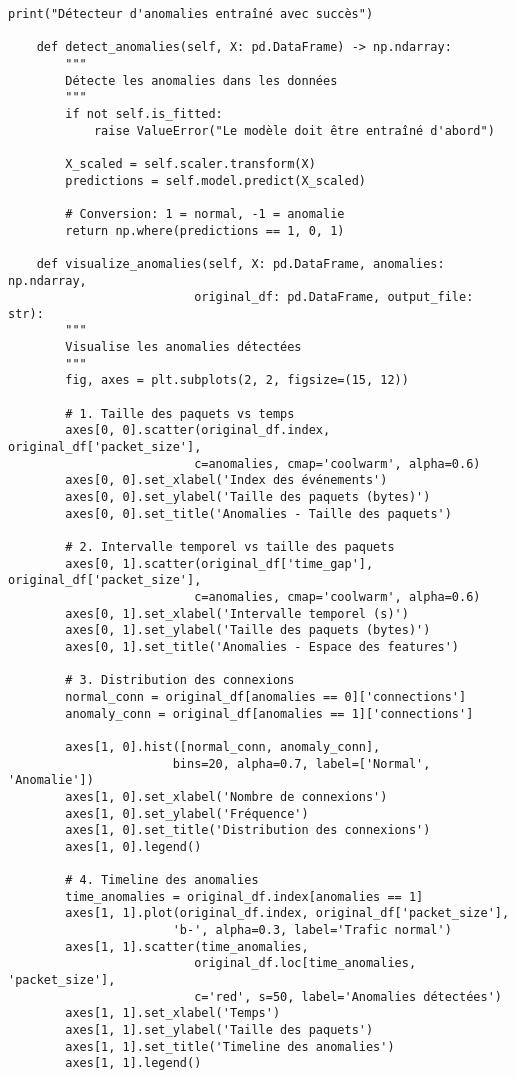 \documentclass[12pt,a4paper]{article}
\begin{document}
\begin{lstlisting}[caption=Détection d'anomalies avec Isolation Forest]
        print("Détecteur d'anomalies entraîné avec succès")
    
    def detect_anomalies(self, X: pd.DataFrame) -> np.ndarray:
        """
        Détecte les anomalies dans les données
        """
        if not self.is_fitted:
            raise ValueError("Le modèle doit être entraîné d'abord")
        
        X_scaled = self.scaler.transform(X)
        predictions = self.model.predict(X_scaled)
        
        # Conversion: 1 = normal, -1 = anomalie
        return np.where(predictions == 1, 0, 1)
    
    def visualize_anomalies(self, X: pd.DataFrame, anomalies: np.ndarray, 
                          original_df: pd.DataFrame, output_file: str):
        """
        Visualise les anomalies détectées
        """
        fig, axes = plt.subplots(2, 2, figsize=(15, 12))
        
        # 1. Taille des paquets vs temps
        axes[0, 0].scatter(original_df.index, original_df['packet_size'],
                          c=anomalies, cmap='coolwarm', alpha=0.6)
        axes[0, 0].set_xlabel('Index des événements')
        axes[0, 0].set_ylabel('Taille des paquets (bytes)')
        axes[0, 0].set_title('Anomalies - Taille des paquets')
        
        # 2. Intervalle temporel vs taille des paquets
        axes[0, 1].scatter(original_df['time_gap'], original_df['packet_size'],
                          c=anomalies, cmap='coolwarm', alpha=0.6)
        axes[0, 1].set_xlabel('Intervalle temporel (s)')
        axes[0, 1].set_ylabel('Taille des paquets (bytes)')
        axes[0, 1].set_title('Anomalies - Espace des features')
        
        # 3. Distribution des connexions
        normal_conn = original_df[anomalies == 0]['connections']
        anomaly_conn = original_df[anomalies == 1]['connections']
        
        axes[1, 0].hist([normal_conn, anomaly_conn], 
                       bins=20, alpha=0.7, label=['Normal', 'Anomalie'])
        axes[1, 0].set_xlabel('Nombre de connexions')
        axes[1, 0].set_ylabel('Fréquence')
        axes[1, 0].set_title('Distribution des connexions')
        axes[1, 0].legend()
        
        # 4. Timeline des anomalies
        time_anomalies = original_df.index[anomalies == 1]
        axes[1, 1].plot(original_df.index, original_df['packet_size'], 
                       'b-', alpha=0.3, label='Trafic normal')
        axes[1, 1].scatter(time_anomalies, 
                          original_df.loc[time_anomalies, 'packet_size'],
                          c='red', s=50, label='Anomalies détectées')
        axes[1, 1].set_xlabel('Temps')
        axes[1, 1].set_ylabel('Taille des paquets')
        axes[1, 1].set_title('Timeline des anomalies')
        axes[1, 1].legend()
        

\end{lstlisting}
\end{document}
